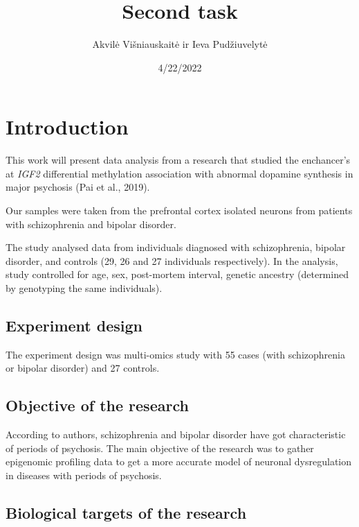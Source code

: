 \documentclass[
]{article}
\title{Second task}
\author{Akvilė Višniauskaitė ir Ieva Pudžiuvelytė}
\date{4/22/2022}
\begin{document}
\maketitle

\hypertarget{introduction}{%
\section{Introduction}\label{introduction}}

This work will present data analysis from a research that studied the
enchancer's at \emph{IGF2} differential methylation association with
abnormal dopamine synthesis in major psychosis (Pai et al., 2019).

Our samples were taken from the prefrontal cortex isolated neurons from
patients with schizophrenia and bipolar disorder.

The study analysed data from individuals diagnosed with schizophrenia,
bipolar disorder, and controls (29, 26 and 27 individuals respectively).
In the analysis, study controlled for age, sex, post-mortem interval,
genetic ancestry (determined by genotyping the same individuals).

\hypertarget{experiment-design}{%
\subsection{Experiment design}\label{experiment-design}}

The experiment design was multi-omics study with 55 cases (with
schizophrenia or bipolar disorder) and 27 controls.

\hypertarget{objective-of-the-research}{%
\subsection{Objective of the research}\label{objective-of-the-research}}

According to authors, schizophrenia and bipolar disorder have got
characteristic of periods of psychosis. The main objective of the
research was to gather epigenomic profiling data to get a more accurate
model of neuronal dysregulation in diseases with periods of psychosis.

\hypertarget{biological-targets-of-the-research}{%
\subsection{Biological targets of the
research}\label{biological-targets-of-the-research}}
\end{document}
